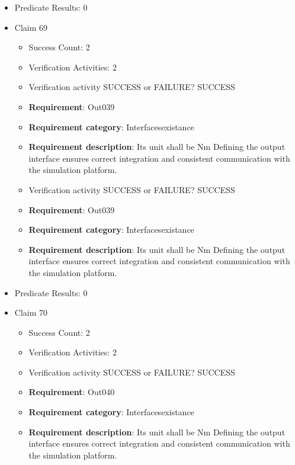 \documentclass{article}
\begin{document}
\begin{itemize}
\begin{itemize}
				\end{itemize}
				
									    
				\item Predicate Results: 0

  				  \item Claim 69
				\begin{itemize}
			    	\item Success Count: 2 
			    	\item Verification Activities: 2
					\item Verification activity SUCCESS or FAILURE? SUCCESS
		
						\item \textbf{Requirement}: Out039 
						\item \textbf{Requirement category}: Interfacesexistance 
						\item \textbf{Requirement description}: Its unit shall be Nm Defining the output interface ensures correct integration and consistent communication with the simulation platform.
					
					\item Verification activity SUCCESS or FAILURE? SUCCESS
		
						\item \textbf{Requirement}: Out039 
						\item \textbf{Requirement category}: Interfacesexistance 
						\item \textbf{Requirement description}: Its unit shall be Nm Defining the output interface ensures correct integration and consistent communication with the simulation platform.
					
				\end{itemize}
				
									    
				\item Predicate Results: 0

  				  \item Claim 70
				\begin{itemize}
			    	\item Success Count: 2 
			    	\item Verification Activities: 2
					\item Verification activity SUCCESS or FAILURE? SUCCESS
		
						\item \textbf{Requirement}: Out040 
						\item \textbf{Requirement category}: Interfacesexistance 
						\item \textbf{Requirement description}: Its unit shall be Nm Defining the output interface ensures correct integration and consistent communication with the simulation platform.
					

\end{itemize}
\end{itemize}
\end{document}
